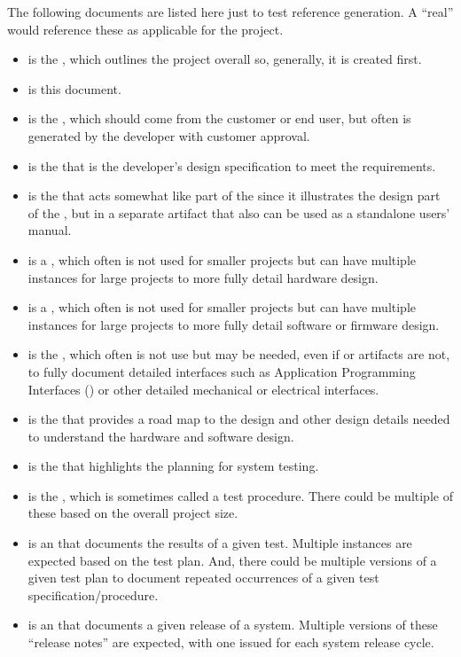 {The following documents are listed here just to test reference generation.
A ``real'' \SDP would reference these as applicable for the project.
\begin{itemize}
	\item \citeExProjOCD is the \OCD, which outlines the project overall so, generally, it is created first.
	\item \citeExProjSDP is this document.
	\item \citeExProjSPS is the \SPS, which should come from the customer or end user, but often is generated by the developer with customer approval.
	\item \citeExProjSSS is the \SSS that is the developer's design specification to meet the \SPS requirements.
	\item \citeExProjSUM is the \SUM that acts somewhat like part of the \SSS since it illustrates the \UI design part of the \SSS, but in a separate artifact that also can be used as a standalone users' manual.
	\item \citeExProjHRS is a \HRS, which often is not used for smaller projects but can have multiple instances for large projects to more fully detail hardware design.	
	\item \citeExProjSRS is a \SRS, which often is not used for smaller projects but can have multiple instances for large projects to more fully detail software or firmware design.
	\item \citeExProjIRS is the \IRS, which often is not use but may be needed, even if \HRS or \SRS artifacts are not, to fully document detailed interfaces such as Application Programming Interfaces (\APIs) or other detailed mechanical or electrical interfaces.
	\item \citeExProjSSDD is the \SSDD that provides a road map to the design and other design details needed to understand the hardware and software design.
	\item \citeExProjSTP is the \STP that highlights the planning for system testing.
	\item \citeExProjSTS is the \STS, which is sometimes called a test procedure. There could be multiple of these based on the overall project size.
	\item \citeExProjSTR is an \STR that documents the results of a given test. Multiple instances are expected based on the test plan. And, there could be multiple versions of a given test plan to document repeated occurrences of a given test specification/procedure.
	\item \citeExProjSVD is an \SVD that documents a given release of a system. Multiple versions of these ``release notes'' are expected, with one \SVD issued for each system release cycle.


\end{itemize}}
